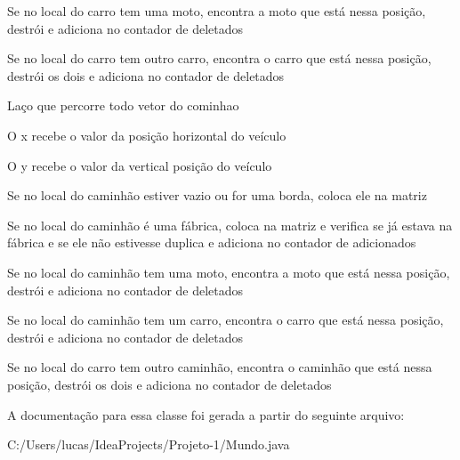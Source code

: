 Se no local do carro tem uma moto, encontra a moto que está nessa posição, destrói e adiciona no contador de deletados

Se no local do carro tem outro carro, encontra o carro que está nessa posição, destrói os dois e adiciona no contador de deletados

Laço que percorre todo vetor do cominhao

O x recebe o valor da posição horizontal do veículo

O y recebe o valor da vertical posição do veículo

Se no local do caminhão estiver vazio ou for uma borda, coloca ele na matriz

Se no local do caminhão é uma fábrica, coloca na matriz e verifica se já estava na fábrica e se ele não estivesse duplica e adiciona no contador de adicionados

Se no local do caminhão tem uma moto, encontra a moto que está nessa posição, destrói e adiciona no contador de deletados

Se no local do caminhão tem um carro, encontra o carro que está nessa posição, destrói e adiciona no contador de deletados

Se no local do carro tem outro caminhão, encontra o caminhão que está nessa posição, destrói os dois e adiciona no contador de deletados 

A documentação para essa classe foi gerada a partir do seguinte arquivo\+:\begin{DoxyCompactItemize}
\item 
C\+:/\+Users/lucas/\+Idea\+Projects/\+Projeto-\/1/Mundo.\+java\end{DoxyCompactItemize}
